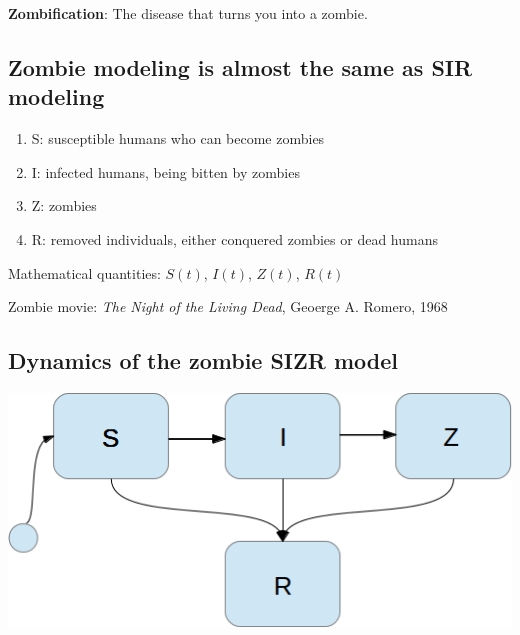 \documentclass[%
twoside,                 %
final,                   %
10pt]{article}
\newenvironment{block_mdfboxadmon}[1][]{
\begin{block_mdfboxmdframed}[frametitle=#1]
}
{
\end{block_mdfboxmdframed}
}
\begin{document}
\textbf{Zombification}: The disease that turns you into a zombie.

\subsection{Zombie modeling is almost the same as SIR modeling}


\begin{block_mdfboxadmon}[Categories.]
\begin{enumerate}
 \item S: susceptible humans who can become zombies

 \item I: infected humans, being bitten by zombies

 \item Z: zombies

 \item R: removed individuals, either conquered zombies or dead humans
\end{enumerate}

\noindent
\end{block_mdfboxadmon}



Mathematical quantities: $S(t)$, $I(t)$, $Z(t)$, $R(t)$

Zombie movie: \emph{The Night of the Living Dead}, Geoerge A. Romero, 1968

\subsection{Dynamics of the zombie SIZR model}


\begin{center}  %
  \centerline{\includegraphics[width=0.4\linewidth]{fig/categories_SIZR.png}}
\end{center}
\end{document}

